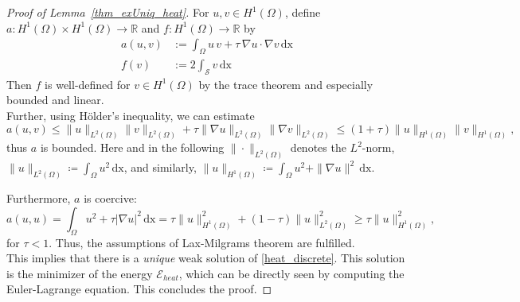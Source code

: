 \documentclass[draft,12pt,openany]{book}
\newcommand{\R}{\mathbb{R}}
\def\S{\mathcal{S}}
\theoremstyle{plainnormal}
\theoremstyle{remark}
\begin{document}
\begin{proof}[Proof of Lemma~\ref{thm_exUniq_heat}]
    For $u,v \in H^1(\Omega)$, define $a: H^1(\Omega)\times H^1(\Omega) \rightarrow \R$ and $f: H^1(\Omega) \rightarrow\R$ by 
    \begin{align*}
        a(u,v) &:= \int_\Omega u\,v + \tau \,\nabla u\cdot\nabla v \,\mathrm{dx}\\
        f(v) & := 2\int_\S v \,\mathrm{dx} 
    \end{align*}
    Then $f$ is well-defined for $v \in H^1(\Omega)$ by the trace theorem and especially bounded and linear.\\
    Further, using Hölder's inequality, we can estimate  $$a(u,v) \leq \|u\|_{L^2(\Omega)}\|v\|_{L^2(\Omega)} + \tau \|\nabla u\|_{L^2(\Omega)}\|\nabla v\|_{L^2(\Omega)} \leq (1 + \tau) \|u\|_{H^1(\Omega)}\|v\|_{H^1(\Omega)},$$ thus $a$ is bounded. Here and in the following $\|\cdot\|_{L^2(\Omega)}$ denotes the $L^2$-norm, $\|u\|_{L^2(\Omega)} \coloneqq \int_\Omega u^2\, \mathrm{dx}$, and similarly, $\|u\|_{H^1(\Omega)} \coloneqq \int_\Omega u^2 + \|\nabla u\|^2\, \mathrm{dx}$. \par
    Furthermore, $a$ is coercive:  $$a(u,u) = \int_\Omega u^2 + \tau |\nabla u|^2 \,\mathrm{dx} = \tau \|u\|^2_{H^1(\Omega)} + (1-\tau) \|u\|^2_{L^2(\Omega)} \geq \tau \|u\|^2_{H^1(\Omega)},$$ for $\tau < 1$. Thus, the assumptions of Lax-Milgrams theorem are fulfilled. \\
    This implies that there is a \emph{unique} weak solution of \cref{heat_discrete}. This solution is the minimizer of the energy $\mathcal{E}_{heat}$, which can be directly seen by computing the Euler-Lagrange equation. This concludes the proof.
\end{proof}
\end{document}

